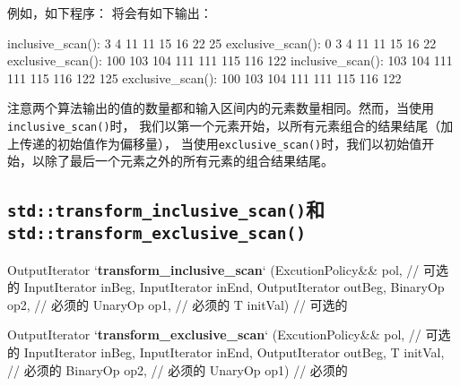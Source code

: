 例如，如下程序：
将会有如下输出：
\begin{blacklisting}
    inclusive_scan():   3 4 11 11 15 16 22 25
    exclusive_scan(): 0 3 4 11 11 15 16 22
    exclusive_scan(): 100 103 104 111 111 115 116 122
    inclusive_scan():     103 104 111 111 115 116 122 125
    exclusive_scan(): 100 103 104 111 111 115 116 122
\end{blacklisting}
注意两个算法输出的值的数量都和输入区间内的元素数量相同。然而，当使用\texttt{inclusive\_scan()}时，
我们以第一个元素开始，以所有元素组合的结果结尾（加上传递的初始值作为偏移量），
当使用\texttt{exclusive\_scan()}时，我们以初始值开始，以除了最后一个元素之外的所有元素的组合结果结尾。

\subsection{\texorpdfstring{\texttt{std::transform\_inclusive\_scan()}和\\
\texttt{std::transform\_exclusive\_scan()}}{}}
\begin{algolisting}
OutputIterator
`\textbf{transform\_inclusive\_scan}` (ExcutionPolicy&& pol,    // 可选的
                          InputIterator inBeg, InputIterator inEnd,
                          OutputIterator outBeg,
                          BinaryOp op2,         // 必须的
                          UnaryOp op1,          // 必须的
                          T initVal)            // 可选的

OutputIterator
`\textbf{transform\_exclusive\_scan}` (ExcutionPolicy&& pol,    // 可选的
                          InputIterator inBeg, InputIterator inEnd,
                          OutputIterator outBeg,
                          T initVal,            // 必须的
                          BinaryOp op2,         // 必须的
                          UnaryOp op1)          // 必须的
\end{algolisting}
